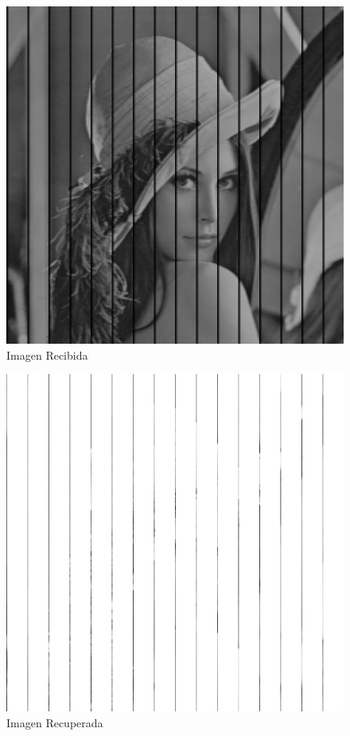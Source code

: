\documentclass{article}
\begin{document}
\begin{multicols}{2}
\begin{figure}[H]
\centering
\includegraphics[scale=0.2]{../img/received_part6_3a.png}
\caption{Imagen Recibida}

\end{figure}

\begin{figure}[H]
\centering
\includegraphics[scale=0.2]{../img/corrected_part6_3a.png}
\caption{Imagen Recuperada}


\end{figure}
\end{multicols}
\end{document}
